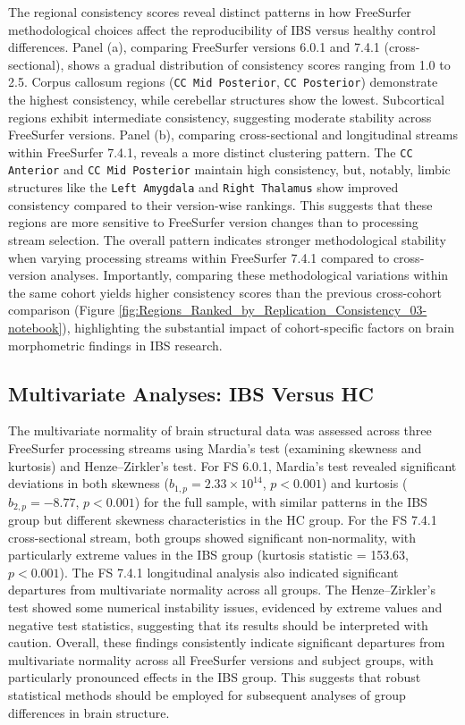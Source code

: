 \documentclass[diagnostics,article,accept,pdftex,moreauthors]{Definitions/mdpi}
\begin{document}
The regional consistency scores reveal distinct patterns in how FreeSurfer methodological choices affect the reproducibility of IBS versus healthy control differences. Panel (a), comparing FreeSurfer versions 6.0.1 and 7.4.1 (cross-sectional), shows a gradual distribution of consistency scores ranging from 1.0 to 2.5. Corpus callosum regions (\texttt{CC Mid Posterior}, \texttt{CC Posterior}) demonstrate the highest consistency, while cerebellar structures show the lowest. Subcortical regions exhibit intermediate consistency, suggesting moderate stability across FreeSurfer versions. Panel (b), comparing cross-sectional and longitudinal streams within FreeSurfer 7.4.1, reveals a more distinct clustering pattern. The \texttt{CC Anterior} and \texttt{CC Mid Posterior} maintain high consistency, but, notably, limbic structures like the \texttt{Left Amygdala} and \texttt{Right Thalamus} show improved consistency compared to their version-wise rankings. This suggests that these regions are more sensitive to FreeSurfer version changes than to processing stream selection. The overall pattern indicates stronger methodological stability when varying processing streams within FreeSurfer 7.4.1 compared to cross-version analyses. Importantly, comparing these methodological variations within the same cohort yields higher consistency scores than the previous cross-cohort comparison (Figure \ref{fig:Regions_Ranked_by_Replication_Consistency_03-notebook}), highlighting the substantial impact of cohort-specific factors on brain morphometric findings in IBS research.



\subsection{Multivariate Analyses: IBS Versus HC}

The multivariate normality of brain structural data was assessed across three FreeSurfer processing streams using Mardia's test (examining skewness and kurtosis) and Henze--Zirkler's test. For FS 6.0.1, Mardia's test revealed significant deviations in both skewness ($b_{1,p} = 2.33 \times 10^{14}$, $p < 0.001$) and kurtosis ($b_{2,p} = -8.77$, $p < 0.001$) for the full sample, with similar patterns in the IBS group but different skewness characteristics in the HC group. For the FS 7.4.1 cross-sectional stream, both groups showed significant non-normality, with particularly extreme values in the IBS group (kurtosis statistic = 153.63, $p < 0.001$). The FS 7.4.1 longitudinal analysis also indicated significant departures from multivariate normality across all groups. The Henze--Zirkler's test showed some numerical instability issues, evidenced by extreme values and negative test statistics, suggesting that its results should be interpreted with caution. Overall, these findings consistently indicate significant departures from multivariate normality across all FreeSurfer versions and subject groups, with particularly pronounced effects in the IBS group. This suggests that robust statistical methods should be employed for subsequent analyses of group differences in brain structure.
\end{document}
